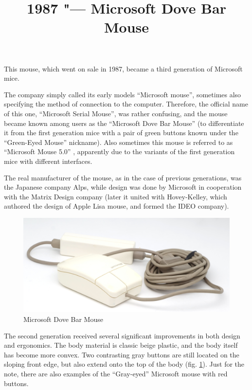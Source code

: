 \documentclass[11pt, a4paper]{article}
\begin{document}
\title{1987 "--- Microsoft Dove Bar Mouse}
\date{}
\maketitle
{}

This mouse, which went on sale in 1987, became a third generation of Microsoft mice. 


The company simply called its early models ``Microsoft mouse'', sometimes also specifying the method of connection to the computer. Therefore, the official name of this one, ``Microsoft Serial Mouse'', was rather confusing, and the mouse became known among users as the ``Microsoft Dove Bar Mouse'' (to differentiate it from the first generation mice with a pair of green buttons known under the ``Green-Eyed Mouse'' nickname). Also sometimes this mouse is referred to as ``Microsoft Mouse 5.0'' \cite{mouses}, apparently due to the variants of the first generation mice with different interfaces.

The real manufacturer of the mouse, as in the case of previous generations, was the Japanese company Alps, while design was done by Microsoft in cooperation with the Matrix Design company (later it united with Hovey-Kelley, which authored the design of Apple Lisa mouse, and formed the IDEO company).

\begin{figure}[h]
   \centering
    \includegraphics[scale=0.55]{1987_microsoft_dove_bar_mouse/pic_30.jpg}
    \caption{Microsoft Dove Bar Mouse}
    \label{fig:MicrosoftDoveBarPic}
\end{figure}

The second generation received several significant improvements in both design and ergonomics. The body material is classic beige plastic, and the body itself has become more convex. Two contrasting gray buttons are still located on the sloping front edge, but also extend onto the top of the body (fig. \ref{fig:MicrosoftDoveBarPic}). Just for the note, there are also examples of the ``Gray-eyed'' Microsoft mouse with red buttons.
\end{document}
